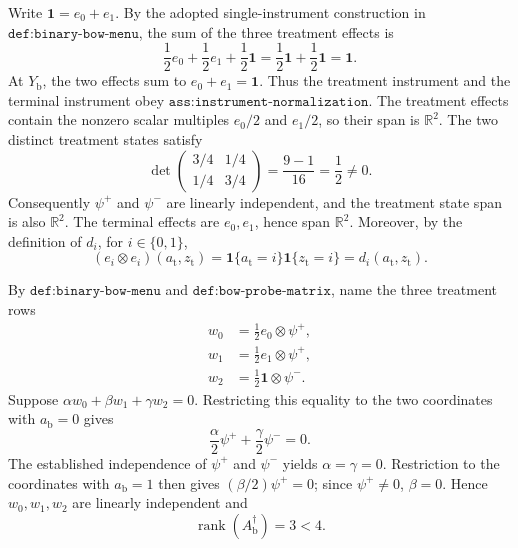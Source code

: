 Write \(\mathbf 1=e_0+e_1\).  By the adopted single-instrument construction in
\(\texttt{def:binary-bow-menu}\), the sum of the three treatment effects is
\[
 \frac12 e_0+\frac12 e_1+\frac12\mathbf 1
 =\frac12\mathbf 1+\frac12\mathbf 1
 =\mathbf 1.
\]
At \(Y_{\mathrm b}\), the two effects sum to
\(e_0+e_1=\mathbf 1\).  Thus the treatment instrument and the terminal
instrument obey \(\texttt{ass:instrument-normalization}\).  The treatment
effects contain the nonzero scalar multiples \(e_0/2\) and \(e_1/2\), so
their span is \(\mathbb R^2\).  The two distinct treatment states satisfy
\[
 \det\!\begin{pmatrix}3/4&1/4\\[2pt]1/4&3/4\end{pmatrix}
 =\frac{9-1}{16}=\frac12\ne0.
\]
Consequently \(\psi^+\) and \(\psi^-\) are linearly independent, and the
treatment state span is also \(\mathbb R^2\).  The terminal effects are
\(e_0,e_1\), hence span \(\mathbb R^2\).  Moreover, by the definition of
\(d_i\), for \(i\in\{0,1\}\),
\[
 (e_i\otimes e_i)(a_{\mathrm t},z_{\mathrm t})
 =\mathbf 1\{a_{\mathrm t}=i\}\mathbf 1\{z_{\mathrm t}=i\}
 =d_i(a_{\mathrm t},z_{\mathrm t}).
\]

By \(\texttt{def:binary-bow-menu}\) and
\(\texttt{def:bow-probe-matrix}\), name the three treatment rows
\[
 \begin{aligned}
 w_0&=\frac12e_0\otimes\psi^+,\\
 w_1&=\frac12e_1\otimes\psi^+,\\
 w_2&=\frac12\mathbf 1\otimes\psi^-.
 \end{aligned}
\]
Suppose \(\alpha w_0+\beta w_1+\gamma w_2=0\).  Restricting this equality
to the two coordinates with \(a_{\mathrm b}=0\) gives
\[
 \frac{\alpha}{2}\psi^++\frac{\gamma}{2}\psi^-=0.
\]
The established independence of \(\psi^+\) and \(\psi^-\) yields
\(\alpha=\gamma=0\).  Restriction to the coordinates with
\(a_{\mathrm b}=1\) then gives \((\beta/2)\psi^+=0\); since
\(\psi^+\ne0\), \(\beta=0\).  Hence \(w_0,w_1,w_2\) are linearly
independent and
\[
 \operatorname{rank}(A_{\mathrm b}^{\dagger})=3<4.
\]

